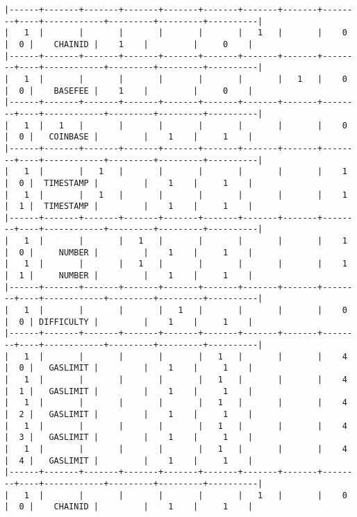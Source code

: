 \documentclass[varwidth=\maxdimen,margin=0.5cm,multi={verbatim}]{standalone}
\begin{document}
\begin{verbatim}
|------+-------+-------+-------+-------+-------+-------+-------+--------+----+------------+---------+---------+----------|
|   1  |       |       |       |       |       |   1   |       |    0   |  0 |    CHAINID |    1    |         |     0    |
|------+-------+-------+-------+-------+-------+-------+-------+--------+----+------------+---------+---------+----------|
|   1  |       |       |       |       |       |       |   1   |    0   |  0 |    BASEFEE |    1    |         |     0    |
|------+-------+-------+-------+-------+-------+-------+-------+--------+----+------------+---------+---------+----------|
|   1  |   1   |       |       |       |       |       |       |    0   |  0 |   COINBASE |         |    1    |     1    |
|------+-------+-------+-------+-------+-------+-------+-------+--------+----+------------+---------+---------+----------|
|   1  |       |   1   |       |       |       |       |       |    1   |  0 |  TIMESTAMP |         |    1    |     1    |
|   1  |       |   1   |       |       |       |       |       |    1   |  1 |  TIMESTAMP |         |    1    |     1    |
|------+-------+-------+-------+-------+-------+-------+-------+--------+----+------------+---------+---------+----------|
|   1  |       |       |   1   |       |       |       |       |    1   |  0 |     NUMBER |         |    1    |     1    |
|   1  |       |       |   1   |       |       |       |       |    1   |  1 |     NUMBER |         |    1    |     1    |
|------+-------+-------+-------+-------+-------+-------+-------+--------+----+------------+---------+---------+----------|
|   1  |       |       |       |   1   |       |       |       |    0   |  0 | DIFFICULTY |         |    1    |     1    |
|------+-------+-------+-------+-------+-------+-------+-------+--------+----+------------+---------+---------+----------|
|   1  |       |       |       |       |   1   |       |       |    4   |  0 |   GASLIMIT |         |    1    |     1    |
|   1  |       |       |       |       |   1   |       |       |    4   |  1 |   GASLIMIT |         |    1    |     1    |
|   1  |       |       |       |       |   1   |       |       |    4   |  2 |   GASLIMIT |         |    1    |     1    |
|   1  |       |       |       |       |   1   |       |       |    4   |  3 |   GASLIMIT |         |    1    |     1    |
|   1  |       |       |       |       |   1   |       |       |    4   |  4 |   GASLIMIT |         |    1    |     1    |
|------+-------+-------+-------+-------+-------+-------+-------+--------+----+------------+---------+---------+----------|
|   1  |       |       |       |       |       |   1   |       |    0   |  0 |    CHAINID |         |    1    |     1    |

\end{verbatim}
\end{document}
